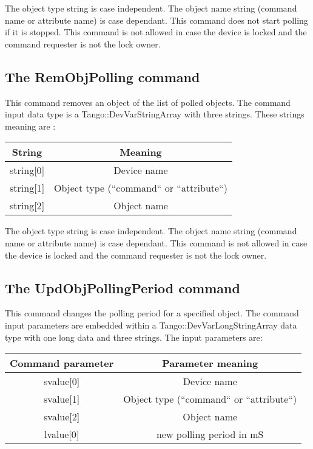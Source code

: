 The object type string is case independent. The object name string
(command name or attribute name) is case dependant. This command does
not start polling if it is stopped. This command is not allowed in
case the device is locked and the command requester is not the lock
owner.


\subsection{The RemObjPolling command}

This command removes an object of the list of polled objects. The
command input data type is a Tango::DevVarStringArray with three strings.
These strings meaning are :

\vspace{0.3cm}


\begin{center}
\begin{longtable}{|c|c|}
\hline 
String & Meaning\tabularnewline
\hline 
\hline 
string{[}0{]} & Device name\tabularnewline
\hline 
string{[}1{]} & Object type (``command`` or ``attribute``)\tabularnewline
\hline 
string{[}2{]} & Object name\tabularnewline
\hline 
\end{longtable}
\par\end{center}

\vspace{0.3cm}


The object type string is case independent. The object name string
(command name or attribute name) is case dependant. This command is
not allowed in case the device is locked and the command requester
is not the lock owner.


\subsection{The UpdObjPollingPeriod command}

This command changes the polling period for a specified object. The
command input parameters are embedded within a Tango::DevVarLongStringArray
data type with one long data and three strings. The input parameters
are:

\vspace{0.3cm}


\begin{center}
\begin{longtable}{|c|c|}
\hline 
Command parameter & Parameter meaning\tabularnewline
\hline 
\hline 
svalue{[}0{]} & Device name\tabularnewline
\hline 
svalue{[}1{]} & Object type (``command`` or ``attribute``)\tabularnewline
\hline 
svalue{[}2{]} & Object name\tabularnewline
\hline 
lvalue{[}0{]} & new polling period in mS\tabularnewline
\hline 
\end{longtable}
\par\end{center}

